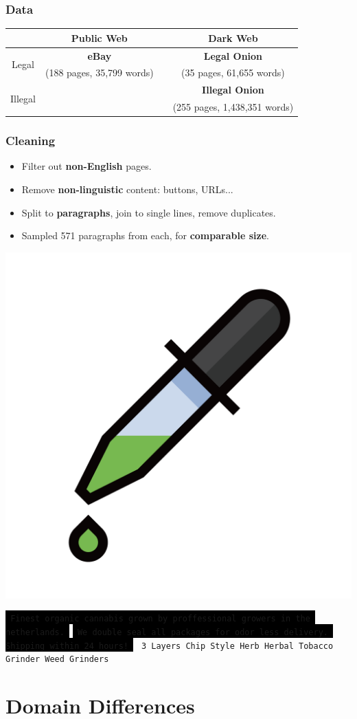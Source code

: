 \documentclass[t,xcolor={svgnames,table},aspectratio=169]{beamer}
\begin{document}
\begin{frame}
	\frametitle{Data}
	\Large
	\begin{center}
	\def\arraystretch{2}
	\begin{tabular}{c|ccc}
	& Public Web && Dark Web \\ 
	\hline
	\multirow{2}{*}{Legal} & \textbf{\color{yellow}\Huge eBay} && \textbf{\color{green}\Huge Legal Onion} \\
	& (188 pages, 35,799 words) && (35 pages, 61,655 words) \\
	\multirow{2}{*}{Illegal} &&& \textbf{\color{red}\Huge Illegal Onion} \\
	&&& (255 pages, 1,438,351 words)
	\end{tabular}
	\end{center}
\end{frame}

\begin{frame}[fragile]
	\frametitle{Cleaning}
	\LARGE
	\begin{itemize}\setlength\itemsep{1em}
		\item Filter out \textbf{non-English} pages.
		\item Remove \textbf{non-linguistic} content: buttons, URLs...
		\item Split to \textbf{paragraphs}, join to single lines, remove duplicates.
		\item Sampled 571 paragraphs from each, for \textbf{comparable size}.
	\end{itemize}
	\begin{center}
	\includegraphics[width=.15\textwidth]{pipette.png}
	\end{center}
	
	\colorbox{black}{\color{OwlGreen}\tt\scriptsize
	Finest organic cannabis grown by proffessional growers in the netherlands.
	}
	\colorbox{black}{\color{OwlGreen}\tt\scriptsize
	We double seal all packages for odor less delivery.	Shipping within 24 hours!
	}
	\colorbox{green!30}{\color{yellow}\tt\scriptsize
	3 Layers  Chip Style Herb Herbal Tobacco Grinder Weed Grinders
	}

\end{frame}

\section{Domain Differences}
\end{document}
